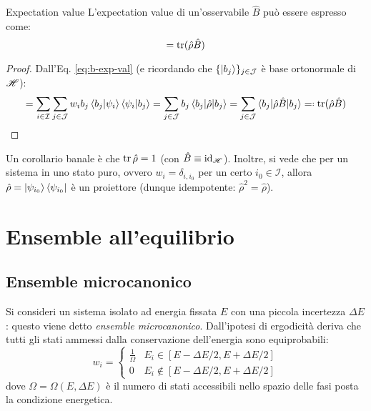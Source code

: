 \begin{theorem}{Expectation value}{}
	L'expectation value di un'osservabile $ \hat{B} $ può essere espresso come:
	\begin{equation}
		[B] = \tr(\hat{\rho} \hat{B})
	\end{equation}

	\tcblower

	\begin{proof}
		Dall'Eq. \ref{eq:b-exp-val} (e ricordando che $ \{\ket{b_j}\}_{j \in \mathcal{J}} $ è base ortonormale di $ \mathscr{H} $):
		\begin{equation*}
			[B] = \sum_{i \in \mathcal{I}} \sum_{j \in \mathcal{J}} w_i b_j \braket{b_j | \psi_i} \braket{\psi_i | b_j} = \sum_{j \in \mathcal{J}} b_j \braket{b_j | \hat{\rho} | b_j} = \sum_{j \in \mathcal{J}} \braket{b_j | \hat{\rho} \hat{B} | b_j} \eqdef \tr(\hat{\rho} \hat{B})
		\end{equation*}
	\end{proof}
\end{theorem}

Un corollario banale è che $ \operatorname{tr}{\hat{\rho}} = 1 $ (con $ \hat{B} \equiv \operatorname{id}_{\mathscr{H}} $). Inoltre, si vede che per un sistema in uno stato puro, ovvero $ w_i = \delta_{i,i_0} $ per un certo $ i_0 \in \mathcal{I} $, allora $ \hat{\rho} = \ket{\psi_{i_0}}\bra{\psi_{i_0}} $ è un proiettore (dunque idempotente: $ \hat{\rho}^2 = \hat{\rho} $).

\section{Ensemble all'equilibrio}

\subsection{Ensemble microcanonico}

Si consideri un sistema isolato ad energia fissata $ E $ con una piccola incertezza $ \Delta E $: questo viene detto \textit{ensemble microcanonico}. Dall'ipotesi di ergodicità deriva che tutti gli stati ammessi dalla conservazione dell'energia sono equiprobabili:
\begin{equation}
	w_i =
	\begin{cases}
		\frac{1}{\Omega} & E_i \in [E - \Delta E/2 , E + \Delta E/2] \\
		0 & E_i \notin [E - \Delta E/2 , E + \Delta E/2]
	\end{cases}
	\label{eq:microcanon-ens}
\end{equation}
dove $ \Omega = \Omega(E, \Delta E) $ è il numero di stati accessibili nello spazio delle fasi posta la condizione energetica.


